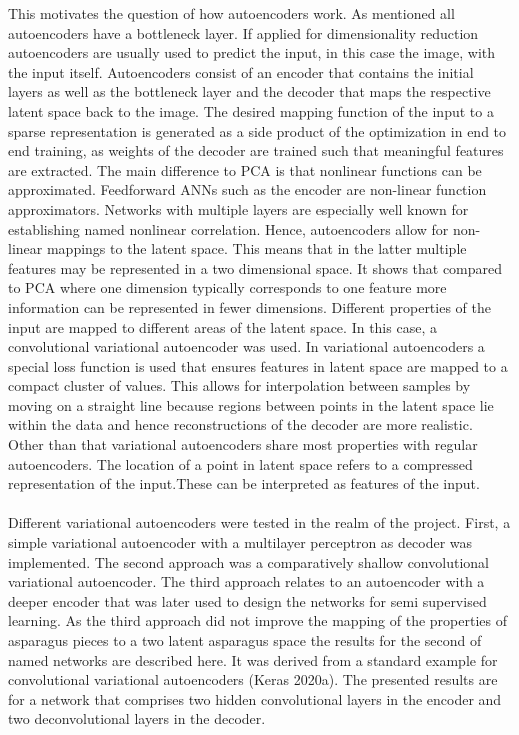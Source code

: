This motivates the question of how autoencoders work. As mentioned all autoencoders have a bottleneck layer. If applied for dimensionality reduction autoencoders are usually used to predict the input, in this case the image, with the input itself. Autoencoders consist of an encoder that contains the initial layers as well as the bottleneck layer and the decoder that maps the respective latent space back to the image. The desired mapping function of the input to a sparse representation is generated as a side product of the optimization in end to end training, as weights of the decoder are trained such that meaningful features are extracted. The main difference to PCA is that nonlinear functions can be approximated. Feedforward ANNs such as the encoder are non-linear function approximators. Networks with multiple layers are especially well known for establishing named nonlinear correlation. Hence, autoencoders allow for non-linear mappings to the latent space. This means that in the latter multiple features may be represented in a two dimensional space. It shows that compared to PCA where one dimension typically corresponds to one feature more information can be represented in fewer dimensions. Different properties of the input are mapped to different areas of the latent space. In this case, a convolutional variational autoencoder was used. In variational autoencoders a special loss function is used that ensures features in latent space are mapped to a compact cluster of values. This allows for interpolation between samples by moving on a straight line because regions between points in the latent space lie within the data and hence reconstructions of the decoder are more realistic. Other than that variational autoencoders share most properties with regular autoencoders. The location of a point in latent space refers to a compressed representation of the input.These can be interpreted as features of the input. \\
\\
Different variational autoencoders were tested in the realm of the project. First, a simple variational autoencoder with a multilayer perceptron as decoder was implemented. The second approach was a comparatively shallow convolutional variational autoencoder. The third approach relates to an autoencoder with a deeper encoder that was later used to design the networks for semi supervised learning. As the third approach did not improve the mapping of the properties of asparagus pieces to a two latent asparagus space the results for the second of named networks are described here. It was derived from a standard example for convolutional variational autoencoders (Keras 2020a). The presented results are for a network that comprises two hidden convolutional layers in the encoder and two deconvolutional layers in the decoder. \\
